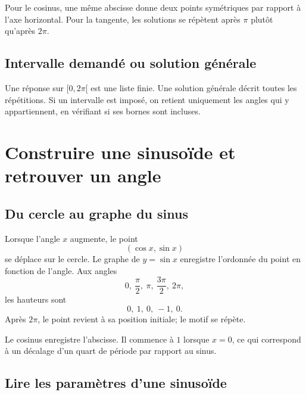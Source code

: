 \begin{center}
\end{center}

Pour le cosinus, une même abscisse donne deux points symétriques par rapport à l'axe horizontal. Pour la tangente, les solutions se répètent après $\pi$ plutôt qu'après $2\pi$.

\subsection{Intervalle demandé ou solution générale}
Une réponse sur $[0,2\pi[$ est une liste finie. Une solution générale décrit toutes les répétitions. Si un intervalle est imposé, on retient uniquement les angles qui y appartiennent, en vérifiant si ses bornes sont incluses.


\section{Construire une sinusoïde et retrouver un angle}
\label{manual:section:16.07}

\subsection{Du cercle au graphe du sinus}

Lorsque l'angle $x$ augmente, le point
\[
(\cos x,\sin x)
\]
se déplace sur le cercle. Le graphe de $y=\sin x$ enregistre l'ordonnée du point en fonction de l'angle. Aux angles
\[
0,\ \frac\pi2,\ \pi,\ \frac{3\pi}2,\ 2\pi,
\]
les hauteurs sont
\[
0,\ 1,\ 0,\ -1,\ 0.
\]
Après $2\pi$, le point revient à sa position initiale; le motif se répète.

Le cosinus enregistre l'abscisse. Il commence à $1$ lorsque $x=0$, ce qui correspond à un décalage d'un quart de période par rapport au sinus.

\subsection{Lire les paramètres d'une sinusoïde}

